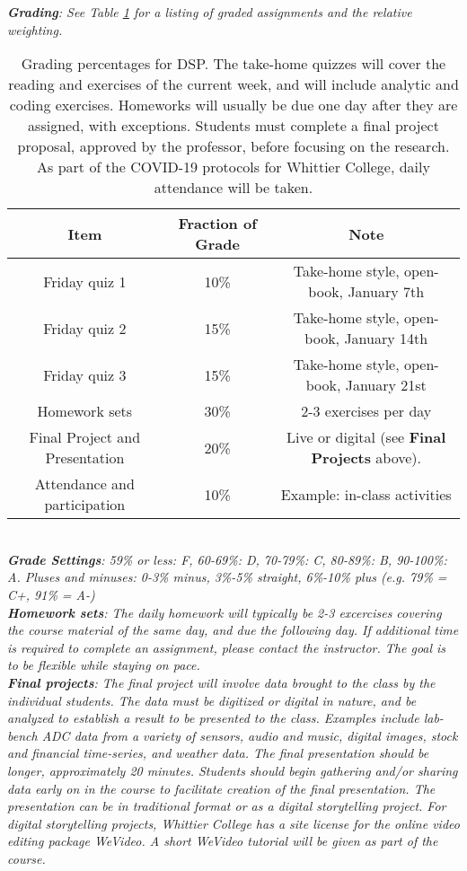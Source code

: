 \documentclass[10pt]{article}
\begin{document}
\textit{\textbf{Grading}:  See Table \ref{tab:grading} for a listing of graded assignments and the relative weighting.}
\begin{table}
\centering
\begin{tabular}{| c | c | c |}
\hline
Item & Fraction of Grade & Note \\ \hline
Friday quiz 1 & 10\% & Take-home style, open-book, January 7th \\ \hline
Friday quiz 2 & 15\% & Take-home style, open-book, January 14th \\ \hline
Friday quiz 3 & 15\% & Take-home style, open-book, January 21st \\ \hline
Homework sets & 30\% & 2-3 exercises per day \\ \hline
Final Project and Presentation & 20\% & Live or digital (see \textbf{Final Projects} above). \\ \hline
Attendance and participation & 10\% & Example: in-class activities \\ \hline
\end{tabular}
\caption{\label{tab:grading} Grading percentages for DSP.  The take-home quizzes will cover the reading and exercises of the current week, and will include analytic and coding exercises.  Homeworks will usually be due one day after they are assigned, with exceptions.  Students must complete a final project proposal, approved by the professor, before focusing on the research.  As part of the COVID-19 protocols for Whittier College, daily attendance will be taken.}
\end{table} \\
\textit{\textbf{Grade Settings}: 59\% or less: F, 60-69\%: D, 70-79\%: C, 80-89\%: B, 90-100\%: A.  Pluses and minuses: 0-3\% minus, 3\%-5\% straight, 6\%-10\% plus (e.g. 79\% = C+, 91\% = A-)} \\
\textit{\textbf{Homework sets}: The daily homework will typically be 2-3 excercises covering the course material of the same day, and due the following day.  If additional time is required to complete an assignment, please contact the instructor.  The goal is to be flexible while staying on pace.} \\
\textit{\textbf{Final projects}: The final project will involve data brought to the class by the individual students.  The data must be digitized or digital in nature, and be analyzed to establish a result to be presented to the class.  Examples include lab-bench ADC data from a variety of sensors, audio and music, digital images, stock and financial time-series, and weather data.  The final presentation should be longer, approximately 20 minutes.  Students should begin gathering and/or sharing data early on in the course to facilitate creation of the final presentation.  The presentation can be in traditional format or as a digital storytelling project.  For digital storytelling projects, Whittier College has a site license for the online video editing package WeVideo.  A short WeVideo tutorial will be given as part of the course.} \\
\end{document}
